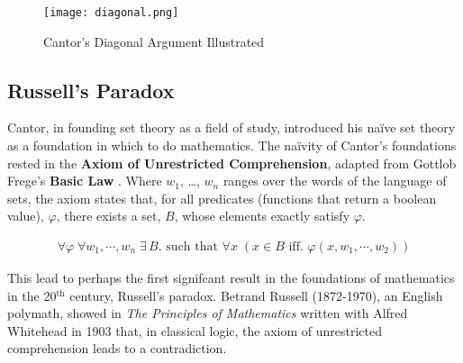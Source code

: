 \begin{figure}[h]
    \texttt{[image: diagonal.png]}
    \centering
    \caption{Cantor's Diagonal Argument Illustrated }
    \label{fig:diagonal}
\end{figure}

\subsection{Russell's Paradox}
Cantor, in founding set theory as a field of study, introduced his na{\"i}ve set
theory \cite{Cantor:1874} as a foundation in which to do mathematics. The
na{\"i}vity of Cantor's foundations rested in the \textbf{Axiom of Unrestricted
Comprehension}, adapted from Gottlob Frege's \textbf{Basic Law }
\cite{frege1884grundlagen}. Where $w_{1}$, \ldots , $w_{n}$ ranges over the words
of the language of sets, the axiom states that, for all predicates (functions
that return a boolean value), $\varphi$, there exists a set, $B$, whose elements
exactly satisfy $\varphi$.

\begin{definition*}
    {\large
    \begin{align*}
        \forall \varphi \; \forall w_{1}, \cdots , w_{n} \; \exists \, B.  \textrm{ such that }
        \forall x  \; (x \in B \textrm{ iff. }  \varphi(x, w_{1},\cdots,w_{2} ))
    \end{align*}
    }%
\end{definition*}
This lead to perhaps the first signifcant result in the foundations of
mathematics in the 20$^{\textrm{th}}$ century, Russell's paradox. Betrand Russell (1872-1970),
an English polymath, showed in \textit{The Principles of Mathematics}
\cite{russell1903principles} written with Alfred Whitehead in 1903 that, in
classical logic, the axiom of unrestricted comprehension leads to a
contradiction.

\begin{theorem*}
\end{theorem*}

